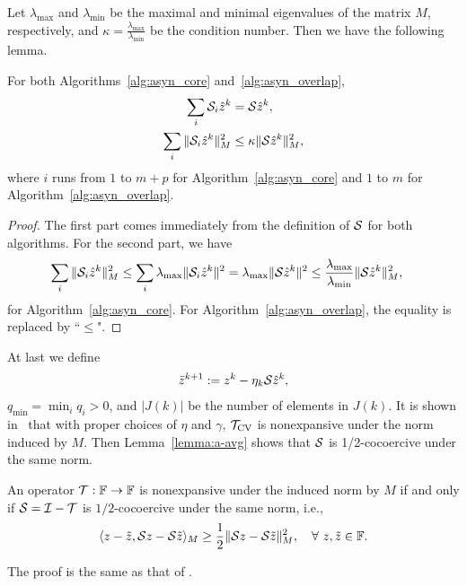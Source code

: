 Let $\lambda_{\max}$ and $\lambda_{\min}$ be the
maximal and minimal eigenvalues of the matrix $M$, respectively, and $\kappa=\frac{\lambda_{\max}}{\lambda_{\min}}$ be the condition number.
Then we have the following lemma.
\begin{lemma}
For both Algorithms~\ref{alg:asyn_core} and~\ref{alg:asyn_overlap},
\begin{align}
\sum_{i}\cS_i\hat{z}^k&=\cS\hat{z}^k,\\
\sum_{i}\|\cS_i\hat{z}^k\|_M^2&\leq \kappa\|\cS\hat{z}^k\|_M^2,\label{eqn:bound_lemma1}
\end{align}
where $i$ runs from $1$ to $m+p$ for Algorithm~\ref{alg:asyn_core} and $1$ to $m$ for Algorithm~\ref{alg:asyn_overlap}.
\end{lemma}
\begin{proof} The first part comes immediately from the definition of ${\mathcal{S}}$ for both algorithms. For the second part, we have
\begin{align}
\sum_{i}\|\cS_i\hat{z}^k\|_M^2&\leq \sum_{i} \lambda_{\max}\|\cS_i\hat{z}^k\|^2 = \lambda_{\max}\|\cS\hat{z}^k\|^2\leq {\lambda_{\max}\over\lambda_{\min}}\|\cS\hat{z}^k\|^2_M,
\end{align}
for Algorithm~\ref{alg:asyn_core}. For Algorithm~\ref{alg:asyn_overlap}, the equality is replaced by ``$\leq$".
\end{proof}


At last we define
\begin{align}\label{eqn:def_bar_x}
\bar{z}^{k+1} := z^k - \eta_k \cS\hat{z}^{k},
\end{align}
$q_{\min}=\min_iq_i>0$, and $|J(k)|$ be the number of elements in $J(k)$. 
It is shown in~\cite{davis2014convergence} that with proper choices of $\eta$ and $\gamma$, ${{\mathcal{T}}_{\textnormal{CV}}}$ is nonexpansive under the norm induced by $M$. Then Lemma~\ref{lemma:a-avg} shows that ${\mathcal{S}}$ is 1/2-cocoercive under the same norm.
\begin{lemma}\label{lemma:a-avg} An operator ${\mathcal{T}}:\mathbb{F}\to\mathbb{F}$ is nonexpansive under the induced norm by $M$ if and only if ${\mathcal{S}} = {\mathcal{I}} - {\mathcal{T}}$ is {${1}/{2}$-cocoercive} under the same norm, i.e.,
\begin{equation}\label{eqn:alpha_avg}
\langle z-\tilde{z},\cS z- \cS\tilde{z}\rangle_M \ge \frac{1}{2}\|\cS z- \cS\tilde{z}\|_M^2,\quad
{\forall~z,\tilde{z}\in\FF}.
\end{equation}
\end{lemma}
The proof is the same as that of \cite[Proposition 4.33]{bauschke2011convex}. 

